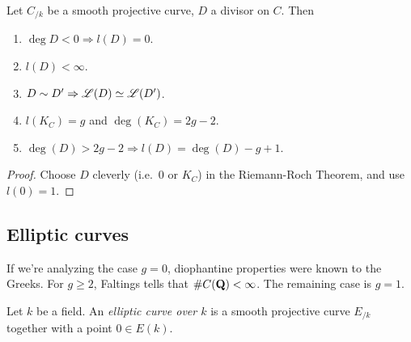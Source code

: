 \begin{theorem}\label{thm:basic-facts}
Let $C_{/k}$ be a smooth projective curve, $D$ a divisor on $C$. Then 
\begin{enumerate}
\item $\deg D<0\Rightarrow l(D)=0$. 
\item $l(D)<\infty$. 
\item $D\sim D'\Rightarrow \mathscr{L}(D)\simeq \mathscr{L}(D')$. 
\item $l(K_C)=g$ and $\deg(K_C)=2 g-2$. 
\item $\deg(D)>2 g-2\Rightarrow l(D)=\deg(D)-g+1$. 
\end{enumerate}
\end{theorem}
\begin{proof}Choose $D$ cleverly (i.e.~$0$ or $K_C$) in the Riemann-Roch 
Theorem, and use $l(0)=1$. 
\end{proof}





\subsection{Elliptic curves}

If we're analyzing the case $g=0$, diophantine properties were known to the 
Greeks. For $g\geqslant 2$, Faltings tells that $\#C(\mathbf{Q})<\infty$. The 
remaining case is $g=1$. 

\begin{definition}
Let $k$ be a field. An \emph{elliptic curve over $k$} is a smooth projective 
curve $E_{/k}$ together with a point $0\in E(k)$. 
\end{definition}

